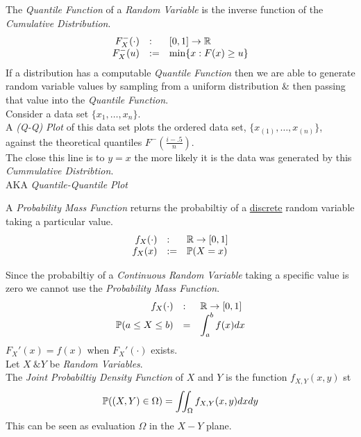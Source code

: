 \documentclass[11pt,a4paper]{article}
\begin{document}
The \textit{Quantile Function} of a \textit{Random Variable} is the inverse function of the \textit{Cumulative Distribution}.\\
\[\begin{array}{rll}
F^-_X(\cdot)&:&[0,1]\to\mathbb{R}\\
F^-_X(u)&:=&\min\{x:F(x)\geq u\}
\end{array}\]
If a distribution has a computable \textit{Quantile Function} then we are able to generate random variable values by sampling from a uniform distribution \& then passing that value into the \textit{Quantile Function}.\\

Consider a data set $\{x_1,\dots,x_n\}$.\\
A \textit{(Q-Q) Plot} of this data set plots the ordered data set, $\{x_{(1)},\dots,x_{(n)}\}$, against the theoretical quantiles $F^-\left(\frac{i-.5}n\right)$.\\
The close this line is to $y=x$ the more likely it is the data was generated by this \textit{Cummulative Distribtion}.\\
\nb AKA \textit{Quantile-Quantile Plot}

A \textit{Probability Mass Function} returns the probabiltiy of a \underline{discrete} random variable taking a particular value.
\[\begin{array}{rll}
f_X(\cdot)&:&\mathbb{R}\to[0,1]\\
f_X(x)&:=&\mathbb{P}(X=x)\\
\end{array}\]

Since the probabiltiy of a \textit{Continuous Random Variable} taking a specific value is zero we cannot use the \textit{Probability Mass Function}.
\[\begin{array}{rll}
f_X(\cdot)&:&\mathbb{R}\to[0,1]\\
\mathbb{P}(a\leq X\leq b)&=&\displaystyle\int_a^bf(x)dx
\end{array}\]
\nb $F_X'(x)=f(x)$ when $F_X'(\cdot)$ exists.\\

Let $X\ \& Y$ be \textit{Random Variables}.\\
The \textit{Joint Probabiltiy Density Function} of $X$ and $Y$ is the function $f_{X,Y}(x,y)$ st
$$\mathbb{P}((X,Y)\in\Omega)=\iint_\Omega f_{X,Y}(x,y)dxdy$$
\nb This can be seen as evaluation $\Omega$ in the $X-Y$ plane.\\
\end{document}
